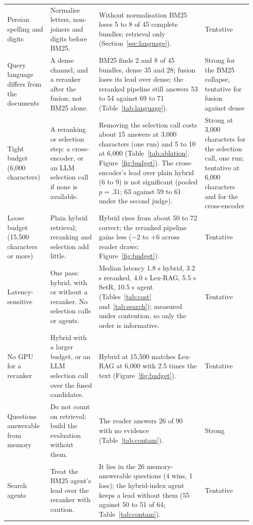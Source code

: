 \begin{table}[t]
\begin{tabularx}{\textwidth}{@{}>{\raggedright\arraybackslash}p{2.5cm}>{\raggedright\arraybackslash}p{4.9cm}>{\raggedright\arraybackslash}X>{\raggedright\arraybackslash}p{1.9cm}@{}}
Persian spelling and digits & Normalise letters, non-joiners and digits before BM25. & Without normalisation BM25 loses 5 to 8 of 45 complete bundles; retrieval only (Section~\ref{sec:language}). & Tentative \\
Query language differs from the documents & A dense channel, and a reranker after the fusion; not BM25 alone. & BM25 finds 2 and 8 of 45 bundles, dense 35 and 28; fusion loses its lead over dense; the reranked pipeline still answers 53 to 54 against 69 to 71 (Table~\ref{tab:language}). & Strong for the BM25 collapse, tentative for fusion against dense \\
Tight budget (6,000 characters) & A reranking or selection step: a cross-encoder, or an LLM selection call if none is available. & Removing the selection call costs about 15 answers at 3,000 characters (one run) and 5 to 10 at 6,000 (Table~\ref{tab:ablation}, Figure~\ref{fig:budget}). The cross-encoder's lead over plain hybrid (6 to 9) is not significant (pooled $p=.31$; 63 against 59 to 61 under the second judge). & Strong at 3,000 characters for the selection call, one run; tentative at 6,000 characters and for the cross-encoder \\
Loose budget (15,500 characters or more) & Plain hybrid retrieval; reranking and selection add little. & Hybrid rises from about 50 to 72 correct; the reranked pipeline gains less ($-$2 to +6 across reader draws; Figure~\ref{fig:budget}). & Tentative \\
Latency-sensitive & One pass: hybrid, with or without a reranker. No selection calls or agents. & Median latency 1.8 s hybrid, 3.2 s reranked, 4.0 s Lex-RAG, 5.5 s SetR, 10.5 s agent (Tables~\ref{tab:cost} and~\ref{tab:search}); measured under contention, so only the order is informative. & Tentative \\
No GPU for a reranker & Hybrid with a larger budget, or an LLM selection call over the fused candidates. & Hybrid at 15,500 matches Lex-RAG at 6,000 with 2.5 times the text (Figure~\ref{fig:budget}). & Tentative \\
Questions answerable from memory & Do not count on retrieval; build the evaluation without them. & The reader answers 26 of 90 with no evidence (Table~\ref{tab:contam}). & Strong \\
Search agents & Treat the BM25 agent's lead over the reranker with caution. & It lies in the 26 memory-answerable questions (4 wins, 1 loss); the hybrid-index agent keeps a lead without them (55 against 50 to 51 of 64; Table~\ref{tab:contam}). & Tentative \\

\end{tabularx}
\end{table}
